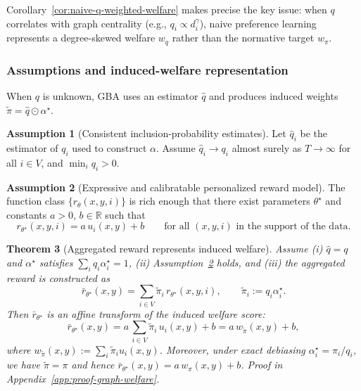 \documentclass{article}
\theoremstyle{plain}
\newtheorem{theorem}{Theorem}[section]
\theoremstyle{definition}
\newtheorem{assumption}[theorem]{Assumption}
\theoremstyle{remark}
\begin{document}
Corollary~\ref{cor:naive-q-weighted-welfare} makes precise the key issue: when
$q$ correlates with graph centrality (e.g., $q_i\propto d_i^\gamma$), naive
preference learning represents a degree-skewed welfare $w_q$ rather than the
normative target $w_\pi$.

\subsubsection{Assumptions and induced-welfare representation}
When $q$ is unknown, GBA uses an estimator $\hat q$ and produces induced weights
$\tilde\pi=\hat q\odot \alpha^\star$.

\begin{assumption}[Consistent inclusion-probability estimates]
\label{ass:qhat}
Let $\hat q_i$ be the estimator of $q_i$ used to construct $\alpha$.
Assume $\hat q_i\to q_i$ almost surely as $T\to\infty$ for all $i\in V$, and
$\min_i q_i>0$.
\end{assumption}

\begin{assumption}[Expressive and calibratable personalized reward model]
\label{ass:expressive}
The function class $\{r_\theta(x,y,i)\}$ is rich enough that there exist
parameters $\theta^\star$ and constants $a>0$, $b\in\mathbb{R}$ such that
\begin{equation}
r_{\theta^\star}(x,y,i)=a\,u_i(x,y)+b
\qquad\text{for all $(x,y,i)$ in the support of the data.}
\end{equation}
\end{assumption}

\begin{theorem}[Aggregated reward represents induced welfare]
\label{thm:graph-welfare}
Assume (i) $\hat q=q$ and $\alpha^\star$ satisfies $\sum_i q_i\alpha_i^\star=1$,
(ii) Assumption~\ref{ass:expressive} holds, and (iii) the aggregated reward is
constructed as
\[
\bar r_{\theta^\star}(x,y)
=
\sum_{i\in V} \tilde\pi_i\,r_{\theta^\star}(x,y,i),
\qquad
\tilde\pi_i := q_i\alpha_i^\star.
\]
Then $\bar r_{\theta^\star}$ is an affine transform of the induced welfare
score:
\begin{equation}
\bar r_{\theta^\star}(x,y)
=
a\,\sum_{i\in V}\tilde\pi_i\,u_i(x,y)+b
=
a\,w_{\tilde\pi}(x,y)+b,
\label{eq:bar-r-induced-welfare}
\end{equation}
where $w_{\tilde\pi}(x,y):=\sum_i \tilde\pi_i u_i(x,y)$.
Moreover, under \emph{exact debiasing} $\alpha_i^\star=\pi_i/q_i$, we have
$\tilde\pi=\pi$ and hence $\bar r_{\theta^\star}(x,y)=a\,w_\pi(x,y)+b$.
Proof in Appendix~\ref{app:proof-graph-welfare}.
\end{theorem}
\end{document}
